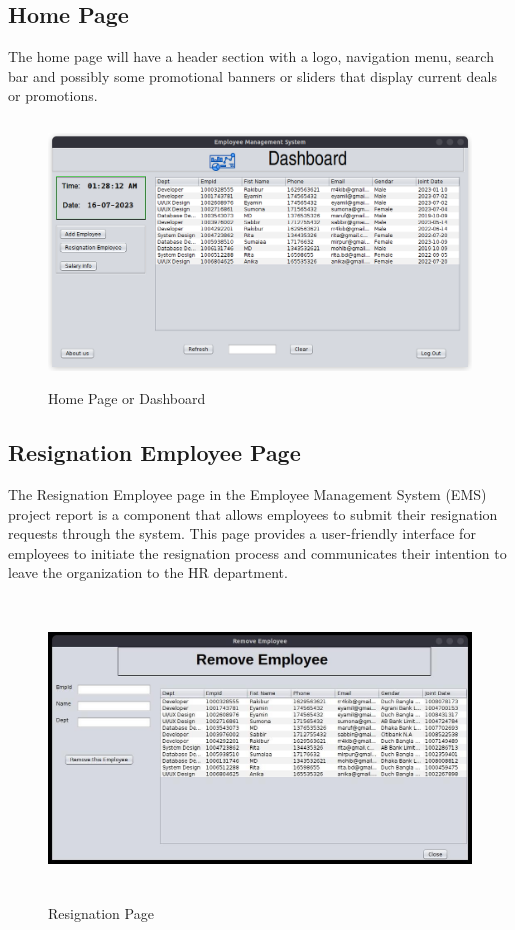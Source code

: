 \subsection{Home Page}
The home page will have a header section with a logo, navigation menu, search bar and possibly
some promotional banners or sliders that display current deals or promotions.
\begin{figure}[h]
    \centering
    \includegraphics[height=7cm]{img/appsimg/home.png}
    \caption{Home Page or Dashboard}
    \label{fig:hoomepage}
\end{figure}
\subsection{Resignation Employee Page}
The Resignation Employee page in the Employee Management System (EMS) project report is a
component that allows employees to submit their resignation requests through the system. This
page provides a user-friendly interface for employees to initiate the resignation process and
communicates their intention to leave the organization to the HR department.
\begin{figure}[h]
    \centering
    \includegraphics[height=8cm]{img/appsimg/remvoe.png}
    \caption{Resignation Page}
    \label{fig:resig}
\end{figure}
\newpage
